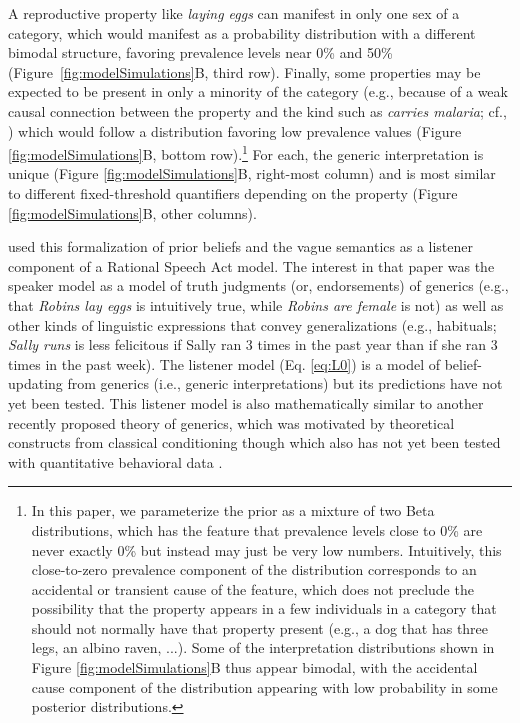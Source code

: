 \documentclass[floatsintext,man]{apa6}
\let\rmarkdownfootnote\footnote%
\def\footnote{\protect\rmarkdownfootnote}
\begin{document}
A reproductive property like \emph{laying eggs} can manifest in only one sex of a category, which would manifest as a probability distribution with a different bimodal structure, favoring prevalence levels near 0\% and 50\% (Figure~\ref{fig:modelSimulations}B, third row).  
Finally, some properties may be expected to be present in only a minority of the category (e.g., because of a weak causal connection between the property and the kind such as \emph{carries malaria}; cf., ) which would follow a distribution  favoring low prevalence values (Figure \ref{fig:modelSimulations}B, bottom row).\footnote{
In this paper, we parameterize the prior as a mixture of two Beta distributions, which has the feature that prevalence levels close to 0\% are never exactly 0\% but instead may just be very low numbers. Intuitively, this close-to-zero prevalence component of the distribution corresponds to an accidental or transient cause of the feature, which does not preclude the possibility that the property appears in a few individuals in a category that should not normally have that property present (e.g., a dog that has three legs, an albino raven, ...).
Some of the interpretation distributions shown in Figure \ref{fig:modelSimulations}B thus appear bimodal, with the accidental cause component of the distribution appearing with low probability in some posterior distributions.%
}
For each, the generic interpretation is unique (Figure \ref{fig:modelSimulations}B, right-most column) and is most similar to different fixed-threshold quantifiers depending on the property (Figure \ref{fig:modelSimulations}B, other columns).

 used this formalization of prior beliefs and the vague semantics as a listener component of a Rational Speech Act model. The interest in that paper was the speaker model as a model of truth judgments (or, endorsements) of generics (e.g., that \emph{Robins lay eggs} is intuitively true, while \emph{Robins are female} is not) as well as other kinds of linguistic expressions that convey generalizations (e.g., habituals;  \emph{Sally runs} is less felicitous if Sally ran 3 times in the past year than if she ran 3 times in the past week).
The listener model (Eq. \ref{eq:L0}) is a model of belief-updating from generics (i.e., generic interpretations) but its predictions have not yet been tested.
This listener model is also mathematically similar to another recently proposed theory of generics, which was motivated by theoretical constructs from classical conditioning though which also has not yet been tested with quantitative behavioral data \cite{vanRooij2020generics}.
\end{document}
